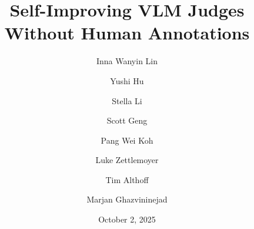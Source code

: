 \documentclass[]{fairmeta}
\title{Self-Improving VLM Judges Without Human Annotations}
\author[1,2,*]{Inna Wanyin Lin}
\author[1]{Yushi Hu}
\author[1,2]{Stella Li}
\author[2]{Scott Geng}
\author[2]{Pang Wei Koh}
\author[1,2]{Luke Zettlemoyer}
\author[2]{Tim Althoff}
\author[1]{Marjan Ghazvininejad}
\affiliation[1]{FAIR at Meta}
\affiliation[2]{University of Washington}
\date{October 2, 2025}
\begin{document}
\maketitle










\clearpage
\newpage



\clearpage
\newpage
\beginappendix

\end{document}
